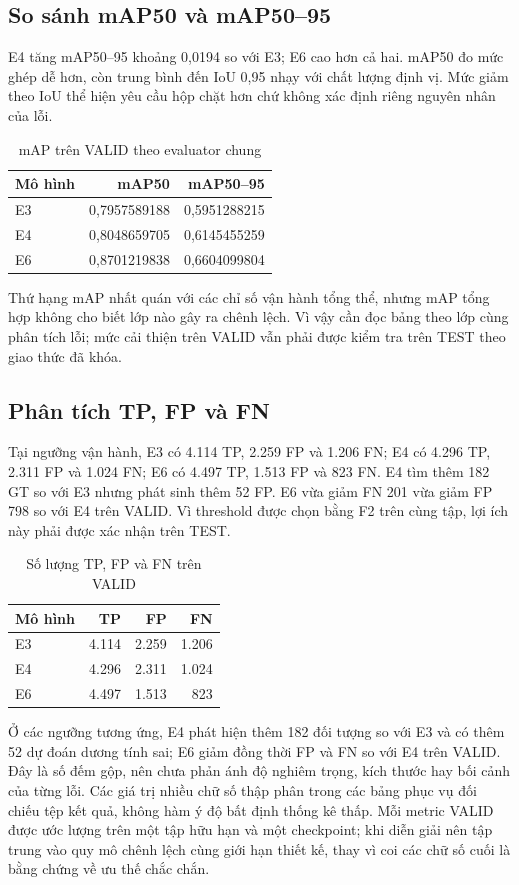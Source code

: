 \documentclass[12pt,a4paper,oneside]{report}
\begin{document}
\subsection{So sánh mAP50 và mAP50--95}
E4 tăng mAP50--95 khoảng 0,0194 so với E3; E6 cao hơn cả hai. mAP50 đo mức ghép dễ hơn, còn trung bình đến IoU 0,95 nhạy với chất lượng định vị. Mức giảm theo IoU thể hiện yêu cầu hộp chặt hơn chứ không xác định riêng nguyên nhân của lỗi.
\begin{table}[H]\centering\small
\caption{mAP trên VALID theo evaluator chung}\label{tab:mapvalid}
\begin{tabular}{lrr}\toprule
Mô hình & mAP50 & mAP50--95\\\midrule
E3 & 0,7957589188 & 0,5951288215\\
E4 & 0,8048659705 & 0,6145455259\\
E6 & 0,8701219838 & 0,6604099804\\
\bottomrule\end{tabular}\end{table}
Thứ hạng mAP nhất quán với các chỉ số vận hành tổng thể, nhưng mAP tổng hợp không cho biết lớp nào gây ra chênh lệch. Vì vậy cần đọc bảng theo lớp cùng phân tích lỗi; mức cải thiện trên VALID vẫn phải được kiểm tra trên TEST theo giao thức đã khóa.

\subsection{Phân tích TP, FP và FN}
Tại ngưỡng vận hành, E3 có 4.114 TP, 2.259 FP và 1.206 FN; E4 có 4.296 TP, 2.311 FP và 1.024 FN; E6 có 4.497 TP, 1.513 FP và 823 FN. E4 tìm thêm 182 GT so với E3 nhưng phát sinh thêm 52 FP. E6 vừa giảm FN 201 vừa giảm FP 798 so với E4 trên VALID. Vì threshold được chọn bằng F2 trên cùng tập, lợi ích này phải được xác nhận trên TEST.

\begin{table}[H]\centering\small
\caption{Số lượng TP, FP và FN trên VALID}\label{tab:countsvalid}
\begin{tabular}{lrrr}\toprule
Mô hình & TP & FP & FN\\\midrule
E3 & 4.114 & 2.259 & 1.206\\
E4 & 4.296 & 2.311 & 1.024\\
E6 & 4.497 & 1.513 & 823\\
\bottomrule\end{tabular}\end{table}
Ở các ngưỡng tương ứng, E4 phát hiện thêm 182 đối tượng so với E3 và có thêm 52 dự đoán dương tính sai; E6 giảm đồng thời FP và FN so với E4 trên VALID. Đây là số đếm gộp, nên chưa phản ánh độ nghiêm trọng, kích thước hay bối cảnh của từng lỗi.
Các giá trị nhiều chữ số thập phân trong các bảng phục vụ đối chiếu tệp kết quả, không hàm ý độ bất định thống kê thấp. Mỗi metric VALID được ước lượng trên một tập hữu hạn và một checkpoint; khi diễn giải nên tập trung vào quy mô chênh lệch cùng giới hạn thiết kế, thay vì coi các chữ số cuối là bằng chứng về ưu thế chắc chắn.
\end{document}
